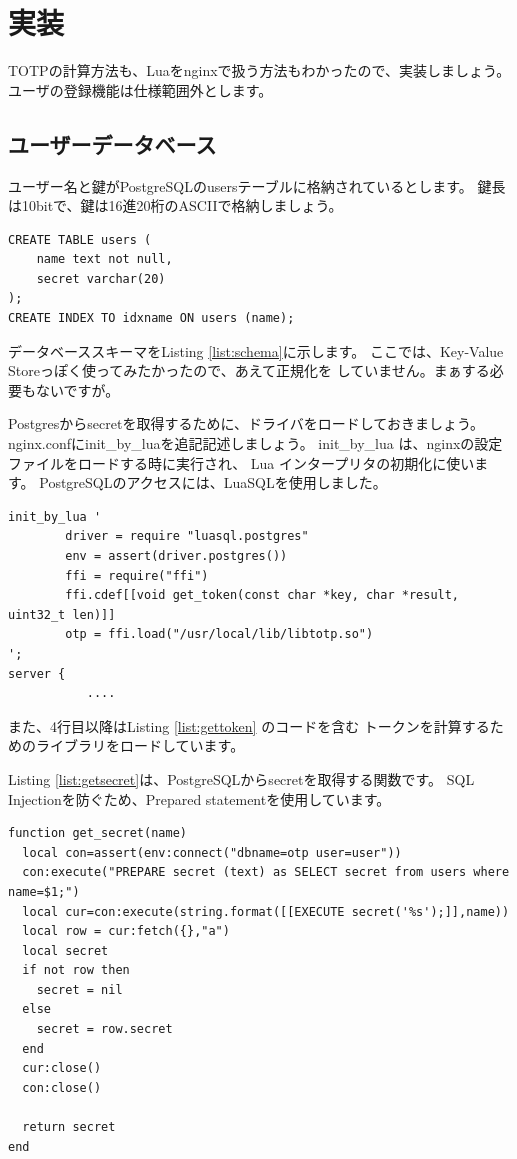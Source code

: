 \chapter*{実装}

TOTPの計算方法も、Luaをnginxで扱う方法もわかったので、実装しましょう。
ユーザの登録機能は仕様範囲外とします。

\section*{ユーザーデータベース}
ユーザー名と鍵がPostgreSQLのusersテーブルに格納されているとします。
鍵長は10bitで、鍵は16進20桁のASCIIで格納しましょう。

\begin{lstlisting}[caption=SQL Schema,label=list:schema]
CREATE TABLE users (
	name text not null,
	secret varchar(20)
);
CREATE INDEX TO idxname ON users (name);
\end{lstlisting}

データベーススキーマをListing \ref{list:schema}に示します。
ここでは、Key-Value Storeっぽく使ってみたかったので、あえて正規化を
していません。まぁする必要もないですが。

Postgresからsecretを取得するために、ドライバをロードしておきましょう。
nginx.confにinit\_by\_luaを追記記述しましょう。
init\_by\_lua は、nginxの設定ファイルをロードする時に実行され、
Lua インタープリタの初期化に使います。
PostgreSQLのアクセスには、LuaSQLを使用しました。

\begin{lstlisting}[caption=Luaインタープリタの初期化,label=list:init]
init_by_lua '
        driver = require "luasql.postgres"
        env = assert(driver.postgres())
        ffi = require("ffi")
        ffi.cdef[[void get_token(const char *key, char *result, uint32_t len)]]
        otp = ffi.load("/usr/local/lib/libtotp.so")
';
server {
           ....
\end{lstlisting}

また、4行目以降はListing \ref{list:gettoken} のコードを含む
トークンを計算するためのライブラリをロードしています。

Listing \ref{list:getsecret}は、PostgreSQLからsecretを取得する関数です。
SQL Injectionを防ぐため、Prepared statementを使用しています。

\begin{lstlisting}[caption=データベースからsecretを取得する関数,label=list:getsecret]
function get_secret(name)
  local con=assert(env:connect("dbname=otp user=user"))
  con:execute("PREPARE secret (text) as SELECT secret from users where name=$1;")
  local cur=con:execute(string.format([[EXECUTE secret('%s');]],name))
  local row = cur:fetch({},"a")
  local secret
  if not row then
    secret = nil
  else
    secret = row.secret
  end
  cur:close()
  con:close()

  return secret
end
\end{lstlisting}


